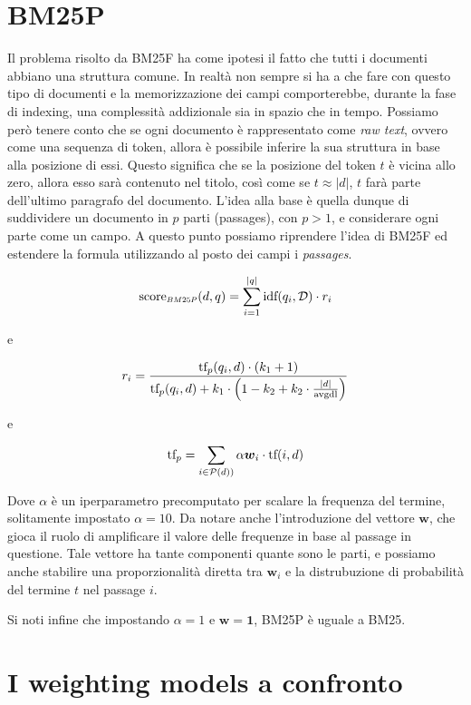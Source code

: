 \section{BM25P}
Il problema risolto da BM25F ha come ipotesi il fatto che tutti i documenti abbiano una struttura comune.
In realtà non sempre si ha a che fare con questo tipo di documenti e la memorizzazione dei campi comporterebbe, durante
la fase di indexing, una complessità addizionale sia in spazio che in tempo.
Possiamo però tenere conto che se ogni documento è rappresentato come \textit{raw text}, ovvero come una sequenza
di token, allora è possibile inferire la sua struttura in base alla posizione di essi.
Questo significa che se la posizione del token $t$ è vicina allo zero, allora esso sarà contenuto nel titolo, così come
se $t \approx \left|d\right|$, $t$ farà parte dell'ultimo paragrafo del documento.
L'idea alla base è quella dunque di suddividere un documento in $p$ parti (passages), con $p>1$, e
considerare ogni parte come un campo. A questo punto possiamo riprendere l'idea di BM25F
ed estendere la formula utilizzando al posto dei campi i \textit{passages}.

\begin{definizione}[BM25 Passages]\label{def:bm25p}
		$$
	\sco_{\scaleto{BM25P}{4pt}}(d, q) = \sum_{i=1}^{|q|} \text{idf}(q_i, \mathcal{D}) \cdot r_i
	$$
	
	e
	
	$$
	r_i = \frac{
		\text{tf}_p(q_i, d) \cdot (k_1 +1)
	}{
		\text{tf}_p(q_i, d) + k_1 \cdot \left(1-k_2 + k_2 \cdot \frac{\left|d\right|}{\text{avgdl}}\right)
	}
	$$
	
	e
	
	$$
	\text{tf}_p = \sum_{i \in \mathcal{P}(d))}{\alpha \boldsymbol{w}_i \cdot \text{tf}(i, d)}
	$$
	
	Dove $\alpha$ è un iperparametro precomputato per scalare la frequenza del termine, solitamente impostato $\alpha = 10$.
	Da notare anche l'introduzione del vettore $\boldsymbol{w}$, che gioca il ruolo di amplificare il valore delle frequenze
	in base al passage in questione.
	Tale vettore ha tante componenti quante sono le parti, e possiamo anche stabilire una proporzionalità
	diretta tra $\boldsymbol{w}_i$ e la distrubuzione di probabilità del termine $t$ nel passage $i$.
	
	Si noti infine che impostando $\alpha=1$ e $\boldsymbol{w} = \boldsymbol{1}$, BM25P è uguale a BM25.
\end{definizione}

\section{I weighting models a confronto}
 
